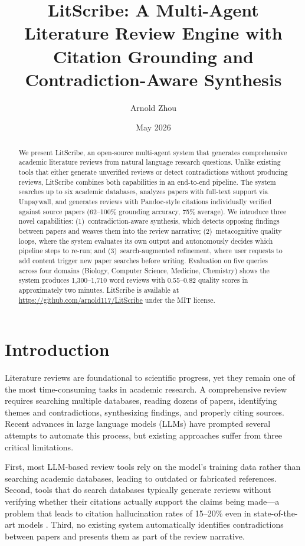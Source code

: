 \documentclass[11pt]{article}
\title{LitScribe: A Multi-Agent Literature Review Engine with \\Citation Grounding and Contradiction-Aware Synthesis}
\author[1]{Arnold Zhou}
\affil[1]{Independent Researcher}
\date{May 2026}
\begin{document}
\maketitle

\begin{abstract}
We present LitScribe, an open-source multi-agent system that generates comprehensive academic literature reviews from natural language research questions. Unlike existing tools that either generate unverified reviews or detect contradictions without producing reviews, LitScribe combines both capabilities in an end-to-end pipeline. The system searches up to six academic databases, analyzes papers with full-text support via Unpaywall, and generates reviews with Pandoc-style citations individually verified against source papers (62--100\% grounding accuracy, 75\% average). We introduce three novel capabilities: (1)~contradiction-aware synthesis, which detects opposing findings between papers and weaves them into the review narrative; (2)~metacognitive quality loops, where the system evaluates its own output and autonomously decides which pipeline steps to re-run; and (3)~search-augmented refinement, where user requests to add content trigger new paper searches before writing. Evaluation on five queries across four domains (Biology, Computer Science, Medicine, Chemistry) shows the system produces 1,300--1,710 word reviews with 0.55--0.82 quality scores in approximately two minutes. LitScribe is available at \url{https://github.com/arnold117/LitScribe} under the MIT license.
\end{abstract}

\section{Introduction}

Literature reviews are foundational to scientific progress, yet they remain one of the most time-consuming tasks in academic research. A comprehensive review requires searching multiple databases, reading dozens of papers, identifying themes and contradictions, synthesizing findings, and properly citing sources. Recent advances in large language models (LLMs) have prompted several attempts to automate this process, but existing approaches suffer from three critical limitations.

First, most LLM-based review tools rely on the model's training data rather than searching academic databases, leading to outdated or fabricated references. Second, tools that do search databases typically generate reviews without verifying whether their citations actually support the claims being made---a problem that leads to citation hallucination rates of 15--20\% even in state-of-the-art models \citep{hallucination2026}. Third, no existing system automatically identifies contradictions between papers and presents them as part of the review narrative.
\end{document}

